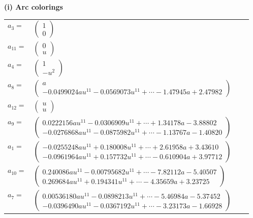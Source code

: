 \documentclass[1p]{elsarticle_modified}
\theoremstyle{definition}
\begin{document}
\flushleft \textbf{(i) Arc colorings}\\
\begin{tabular}{m{7pt} m{180pt} m{7pt} m{180pt} }
\flushright $a_{3}=$&$\begin{pmatrix}1\\0\end{pmatrix}$ \\
\flushright $a_{11}=$&$\begin{pmatrix}0\\u\end{pmatrix}$ \\
\flushright $a_{4}=$&$\begin{pmatrix}1\\- u^2\end{pmatrix}$ \\
\flushright $a_{8}=$&$\begin{pmatrix}a\\-0.0499024 a u^{11}-0.0569073 u^{11}+\cdots-1.47945 a+2.47982\end{pmatrix}$ \\
\flushright $a_{12}=$&$\begin{pmatrix}u\\u\end{pmatrix}$ \\
\flushright $a_{9}=$&$\begin{pmatrix}0.0222156 a u^{11}-0.0306909 u^{11}+\cdots+1.34178 a-3.88802\\-0.0276868 a u^{11}-0.0875982 u^{11}+\cdots-1.13767 a-1.40820\end{pmatrix}$ \\
\flushright $a_{1}=$&$\begin{pmatrix}-0.0255248 a u^{11}+0.180008 u^{11}+\cdots+2.61958 a+3.43610\\-0.0961964 a u^{11}+0.157732 u^{11}+\cdots-0.610904 a+3.97712\end{pmatrix}$ \\
\flushright $a_{10}=$&$\begin{pmatrix}0.240086 a u^{11}-0.00795682 u^{11}+\cdots-7.82112 a-5.40507\\0.269684 a u^{11}+0.194341 u^{11}+\cdots-4.35659 a+3.23725\end{pmatrix}$ \\
\flushright $a_{7}=$&$\begin{pmatrix}0.00536180 a u^{11}-0.0898213 u^{11}+\cdots-5.46984 a-5.37452\\-0.0396490 a u^{11}-0.0367192 u^{11}+\cdots-3.23173 a-1.66928\end{pmatrix}$ \\

\end{tabular}
\end{document}
